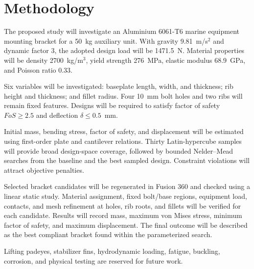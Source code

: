 \chapter{Methodology}

The proposed study will investigate an Aluminium 6061-T6 marine equipment mounting bracket for a 50~kg auxiliary unit. With gravity 9.81~m/s$^2$ and dynamic factor 3, the adopted design load will be 1471.5~N. Material properties will be density 2700~kg/m$^3$, yield strength 276~MPa, elastic modulus 68.9~GPa, and Poisson ratio 0.33.

Six variables will be investigated: baseplate length, width, and thickness; rib height and thickness; and fillet radius. Four 10~mm bolt holes and two ribs will remain fixed features. Designs will be required to satisfy factor of safety $FoS\geq2.5$ and deflection $\delta\leq0.5$~mm.

Initial mass, bending stress, factor of safety, and displacement will be estimated using first-order plate and cantilever relations. Thirty Latin-hypercube samples will provide broad design-space coverage, followed by bounded Nelder--Mead searches from the baseline and the best sampled design. Constraint violations will attract objective penalties.

Selected bracket candidates will be regenerated in Fusion 360 and checked using a linear static study. Material assignment, fixed bolt/base regions, equipment load, contacts, and mesh refinement at holes, rib roots, and fillets will be verified for each candidate. Results will record mass, maximum von Mises stress, minimum factor of safety, and maximum displacement. The final outcome will be described as the best compliant bracket found within the parameterized search.

Lifting padeyes, stabilizer fins, hydrodynamic loading, fatigue, buckling, corrosion, and physical testing are reserved for future work.
